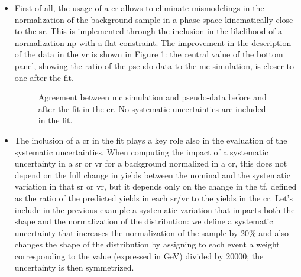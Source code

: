 \begin{itemize}
\item First of all, the usage of a \gls{cr} allows to eliminate mismodelings in the normalization of the background sample in a phase space 
kinematically close to the \gls{sr}. This is implemented through the inclusion in the likelihood of a normalization \gls{np} with a flat constraint.
The improvement in the description of the data in the \gls{vr} is shown in Figure \ref{fig:stat:VRclosure}: the central value of the bottom panel,
showing the ratio of the pseudo-data to the \gls{mc} simulation, is closer to one after the fit.

\begin{figure}[h]
\centering 
{}
\caption{
Agreement between \gls{mc} simulation and pseudo-data  before and  after the fit in the \gls{cr}. No systematic uncertainties are included in the fit. 
}
\label{fig:stat:VRclosure}
\end{figure}

\item The inclusion of a \gls{cr} in the fit plays a key role also in the evaluation of the systematic uncertainties. 
When computing the impact of a systematic uncertainty in a \gls{sr} or \gls{vr} for a background normalized in a \gls{cr}, 
this does not depend on the full change in yields between the nominal and the systematic variation in that \gls{sr} or \gls{vr},
but it depends only on the change in the \gls{tf}, defined as the ratio of the predicted yields in each \gls{sr}/\gls{vr} to the yields in the \gls{cr}. 
Let's include in the previous example a systematic variation that impacts both the shape and the normalization of the \meff distribution: 
we define a systematic uncertainty that increases the normalization of the sample by 20\% and also changes the shape of the \meff distribution by 
assigning to each event a weight corresponding to the \meff value (expressed in GeV) divided by 20000; the uncertainty is then symmetrized. 


\end{itemize}
